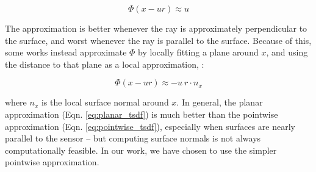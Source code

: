 \documentclass[10pt,twocolumn,letterpaper]{article}
\begin{document}
\begin{equation} 
\label{eq:pointwise_tsdf} 
	\Phi(x - ur) \approx u 
\end{equation}

The approximation is better whenever the ray is approximately
perpendicular to the surface, and worst whenever the ray is parallel to the
surface. Because of this, some works \cite{Bylow2013} instead approximate
$\Phi$ by locally fitting a plane around $x$, and using the distance to that
plane as a local approximation, \ie:

\begin{equation} 
\label{eq:planar_tsdf} 
	\Phi(x - ur) \approx -u~r \cdot n_x
\end{equation}

\noindent where $n_x$ is the local surface normal around $x$. In general, the
planar approximation (Eqn. \ref{eq:planar_tsdf}) is much better than the
pointwise approximation (Eqn. \ref{eq:pointwise_tsdf}), especially when surfaces
are nearly parallel to the sensor -- but computing surface normals is not
always computationally feasible. In our work, we have chosen to use
the simpler pointwise approximation.
\end{document}
